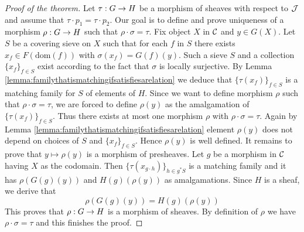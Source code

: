 \begin{proof}[Proof of the theorem]
Let $\tau:G\rightarrow H$ be a morphism of sheaves with respect to ${\mathcal J}$ and assume that $\tau\cdot p_1 = \tau \cdot p_2$. Our goal is to define and prove uniqueness of a morphism $\rho:G\rightarrow H$ such that $\rho\cdot \sigma = \tau$. Fix object $X$ in ${\mathcal C}$ and $y\in G(X)$. Let $S$ be a covering sieve on $X$ such that for each $f$ in $S$ there exists $x_f\in F(\mathrm{dom}(f))$ with $\sigma(x_f) = G(f)(y)$. Such a sieve $S$ and a collection $\{x_f\}_{f\in S}$ exist according to the fact that $\sigma$ is locally surjective. By Lemma \ref{lemma:familythatismatchingifsatisfiesarelation} we deduce that $\{\tau(x_f)\}_{f\in S}$ is a matching family for $S$ of elements of $H$. Since we want to define morphism $\rho$ such that $\rho\cdot \sigma =\tau$, we are forced to define $\rho(y)$ as the amalgamation of $\{\tau(x_f)\}_{f\in S}$. Thus there exists at most one morphism $\rho$ with $\rho\cdot \sigma =\tau$. Again by Lemma \ref{lemma:familythatismatchingifsatisfiesarelation} element $\rho(y)$ does not depend on choices of $S$ and $\{x_f\}_{f\in S}$. Hence $\rho(y)$ is well defined. It remains to prove that $y\mapsto \rho(y)$ is a morphism of presheaves. Let $g$ be a morphism in ${\mathcal C}$ having $X$ as the codomain. Then $\{\tau(x_{g\cdot h})\}_{h\in g^*S}$ is a matching family and it has $\rho\left(G(g)(y)\right)$ and $H(g)\left(\rho(y)\right)$ as amalgamations. Since $H$ is a sheaf, we derive that
$$\rho\left(G(g)(y)\right) = H(g)\left(\rho(y)\right)$$
This proves that $\rho:G\rightarrow H$ is a morphism of sheaves. By definition of $\rho$ we have $\rho\cdot \sigma = \tau$ and this finishes the proof.
\end{proof}





\small



